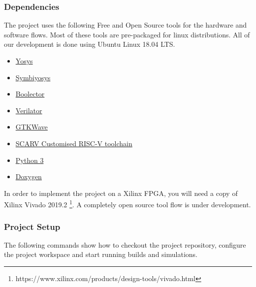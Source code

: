 
\subsubsection{Dependencies}

The project uses the following Free and Open Source tools for
the hardware and software flows.
Most of these tools are pre-packaged for linux distributions.
All of our development is done using Ubuntu Linux 18.04 LTS.

\begin{itemize}[noitemsep]
\item \href{http://www.clifford.at/yosys/}{Yosys}
\item \href{https://symbiyosys.readthedocs.io/en/latest/}{Symbiyosys}
\item \href{https://boolector.github.io/}{Boolector}
\item \href{https://www.veripool.org/wiki/verilator}{Verilator}
\item \href{http://gtkwave.sourceforge.net/}{GTKWave}
\item \href{https://github.com/scarv/riscv-gnu-toolchain.git}{SCARV Customised RISC-V toolchain}
\item \href{https://www.python.org/downloads/}{Python 3}
\item \href{http://www.doxygen.nl}{Doxygen}
\end{itemize}

In order to implement the project on a Xilinx FPGA, you will
need a copy of Xilinx Vivado 2019.2
\footnote{https://www.xilinx.com/products/design-tools/vivado.html}.
A completely open source tool flow is under development.

\subsubsection{Project Setup}

The following commands show how to checkout the \SCARVSOC project
repository, configure the project workspace and start running
builds and simulations.

